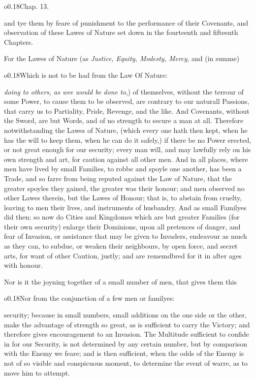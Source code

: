 
\noindent\begin{wrapfigure}[2]{o}{0.18\textwidth}\wrapadj Chap. 13.
\end{wrapfigure} and tye them by feare of punishment to the
performance of their Covenants, and observation of these Lawes of
Nature set down in the fourteenth and fifteenth Chapters.

For the Lawes of Nature (as \textit{Justice, Equity, Modesty, Mercy},
and (in summe) \begin{wrapfigure}[4]{o}{0.18\textwidth}\wrapadj Which
is not to be had from the Law Of Nature: \end{wrapfigure}
\textit{doing to others, as wee would be done to},) of themselves,
without the terrour of some Power, to cause them to be observed, are
contrary to our naturall Passions, that carry us to Partiality, Pride,
Revenge, and the like. And Covenants, without the Sword, are but
Words, and of no strength to secure a man at all. Therefore
notwithstanding the Lawes of Nature, (which every one hath then kept,
when he has the will to keep them, when he can do it safely,) if there
be no Power erected, or not great enough for our security; every man
will, and may lawfully rely on his own strength and art, for caution
against all other men. And in all places,  where men have
lived by small Families, to robbe and spoyle one another, has been a
Trade, and so farre from being reputed against the Law of Nature, that
the greater spoyles they gained, the greater was their honour; and men
observed no other Lawes therein, but the Lawes of Honour; that is, to
abstain from cruelty, leaving to men their lives, and instruments of
husbandry. And as small Familyes did then; so now do Cities and
Kingdomes which are but greater Families (for their own security)
enlarge their Dominions, upon all pretences of danger, and fear of
Invasion, or assistance that may be given to Invaders, endeavour as
much as they can, to subdue, or weaken their neighbours, by open
force, and secret arts, for want of other Caution, justly; and are
rememdbred for it in after ages with honour.

Nor is it the joyning together of a small number of men, that gives
them this \begin{wrapfigure}[5]{o}{0.18\textwidth}\wrapadj Nor from the
conjunction of a few men or familyes: \end{wrapfigure} security;
because in small numbers, small additions on the one side or the
other, make the advantage of strength so great, as is sufficient to
carry the Victory; and therefore gives encouragement to an Invasion.
The Multitude sufficient to confide in for our Security, is not
determined by any certain number, but by comparison with the Enemy we
feare; and is then sufficient, when the odds of the Enemy is not of so
visible and conspicuous moment, to determine the event of warre, as to
move him to attempt.

